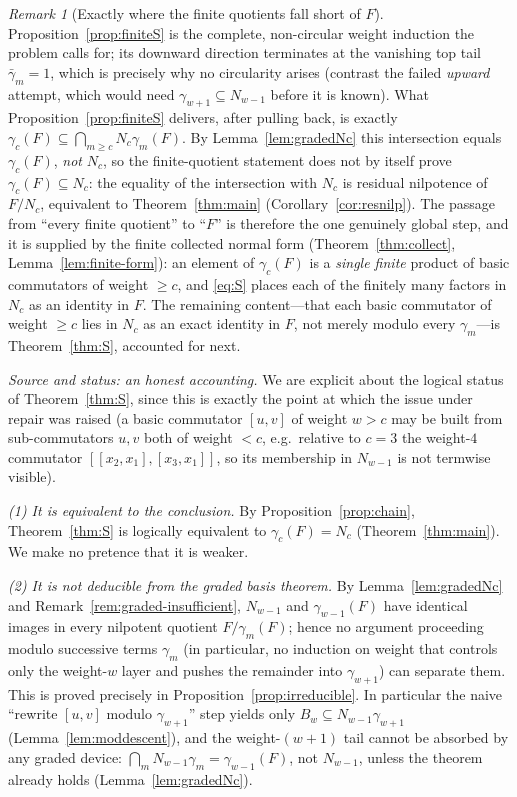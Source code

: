 \documentclass{amsart}
\theoremstyle{definition}
\theoremstyle{remark}
\newtheorem{remark}{Remark}
\begin{document}
\begin{remark}[Exactly where the finite quotients fall short of $F$]\label{rem:liftgap}
Proposition~\ref{prop:finiteS} is the complete, non-circular weight induction the
problem calls for; its downward direction terminates at the vanishing top tail
$\bar\gamma_m=1$, which is precisely why no circularity arises (contrast the failed
\emph{upward} attempt, which would need $\gamma_{w+1}\subseteq N_{w-1}$ before it is
known). What Proposition~\ref{prop:finiteS} delivers, after pulling back, is exactly
$\gamma_c(F)\subseteq\bigcap_{m\ge c}N_c\gamma_m(F)$. By Lemma~\ref{lem:gradedNc}
this intersection equals $\gamma_c(F)$, \emph{not} $N_c$, so the finite-quotient
statement does not by itself prove $\gamma_c(F)\subseteq N_c$: the equality of the
intersection with $N_c$ is residual nilpotence of $F/N_c$, equivalent to
Theorem~\ref{thm:main} (Corollary~\ref{cor:resnilp}). The passage from ``every
finite quotient'' to ``$F$'' is therefore the one genuinely global step, and it is
supplied by the finite collected normal form (Theorem~\ref{thm:collect},
Lemma~\ref{lem:finite-form}): an element of $\gamma_c(F)$ is a \emph{single finite}
product of basic commutators of weight $\ge c$, and \eqref{eq:S} places each of the
finitely many factors in $N_c$ as an identity in $F$. The remaining content---that
each basic commutator of weight $\ge c$ lies in $N_c$ as an exact identity in $F$,
not merely modulo every $\gamma_m$---is Theorem~\ref{thm:S}, accounted for next.
\end{remark}

\noindent\emph{Source and status: an honest accounting.} We are explicit about
the logical status of Theorem~\ref{thm:S}, since this is exactly the point at which
the issue under repair was raised (a basic commutator $[u,v]$ of weight $w>c$ may
be built from sub-commutators $u,v$ both of weight $<c$, e.g.\ relative to $c=3$ the
weight-$4$ commutator $[[x_2,x_1],[x_3,x_1]]$, so its membership in $N_{w-1}$ is not
termwise visible).

\emph{(1) It is equivalent to the conclusion.} By Proposition~\ref{prop:chain},
Theorem~\ref{thm:S} is logically equivalent to $\gamma_c(F)=N_c$
(Theorem~\ref{thm:main}). We make no pretence that it is weaker.

\emph{(2) It is not deducible from the graded basis theorem.} By
Lemma~\ref{lem:gradedNc} and Remark~\ref{rem:graded-insufficient}, $N_{w-1}$ and
$\gamma_{w-1}(F)$ have identical images in every nilpotent quotient $F/\gamma_m(F)$;
hence no argument proceeding modulo successive terms $\gamma_m$ (in particular, no
induction on weight that controls only the weight-$w$ layer and pushes the
remainder into $\gamma_{w+1}$) can separate them. This is proved precisely in
Proposition~\ref{prop:irreducible}. In particular the naive ``rewrite $[u,v]$
modulo $\gamma_{w+1}$'' step yields only $B_w\subseteq N_{w-1}\gamma_{w+1}$
(Lemma~\ref{lem:moddescent}), and the weight-$(w+1)$ tail cannot be absorbed by any
graded device: $\bigcap_{m} N_{w-1}\gamma_m=\gamma_{w-1}(F)$, not $N_{w-1}$, unless
the theorem already holds (Lemma~\ref{lem:gradedNc}).
\end{document}
